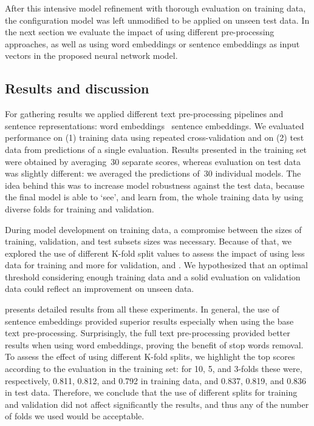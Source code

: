 After this intensive model refinement with thorough evaluation on training data, the configuration model was left unmodified to be applied on unseen test data.
In the next section we evaluate the impact of using different pre-processing approaches, as well as using word embeddings or sentence embeddings as input vectors in the proposed neural network model.


\subsection{Results and discussion}

For gathering results we applied different text pre-processing pipelines and sentence representations: word embeddings \versus\ sentence embeddings.
We evaluated performance on (1) training data using repeated cross-validation and on (2) test data from predictions of a single evaluation.
Results presented in the training set were obtained by averaging~30 separate scores, whereas evaluation on test data was slightly different: we averaged the predictions of~30 individual models.
The idea behind this was to increase model robustness against the test data, because the final model is able to `see', and learn from, the whole training data by using diverse folds for training and validation.

During model development on training data, a compromise between the sizes of training, validation, and test subsets sizes was necessary.
Because of that, we explored the use of different K-fold split values to assess the impact of using less data for training and more for validation, and \viceversa.
We hypothesized that an optimal threshold considering enough training data and a solid evaluation on validation data could reflect an improvement on unseen data.



 presents detailed results from all these experiments.
In general, the use of sentence embeddings provided superior results especially when using the base text pre-processing.
Surprisingly, the full text pre-processing provided better results when using word embeddings, proving the benefit of stop words removal.
To assess the effect of using different K-fold splits, we highlight the top scores according to the evaluation in the training set: for 10, 5, and 3-folds these were, respectively, 0.811, 0.812, and 0.792 in training data, and 0.837, 0.819, and 0.836 in test data.
Therefore, we conclude that the use of different splits for training and validation did not affect significantly the results, and thus any of the number of folds we used would be acceptable.

